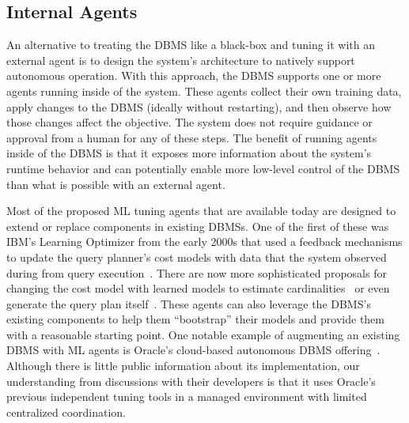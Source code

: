 \documentclass[11pt,times]{article}
\begin{document}
\subsection{Internal Agents}
\label{sec:ml-internal}
An alternative to treating the DBMS like a black-box and tuning it with an 
external agent is to design the system's architecture to natively
support autonomous operation. With this approach, the DBMS supports one or more 
agents running inside of the system. These agents collect their own training data, apply changes to 
the 
DBMS (ideally without restarting), and then observe how those changes affect the objective. The 
system does not require guidance or approval from a human for any of these steps.
The benefit of running agents inside of the DBMS is that it exposes more 
information about the system's runtime behavior and can potentially enable more low-level control 
of the DBMS than what is possible with an external agent.

Most of the proposed ML tuning agents that are available today are designed to extend or replace 
components in existing DBMSs. One of the first of these was IBM's 
Learning Optimizer from the early 2000s that used a feedback mechanisms to update 
the query planner's cost models with data that the system observed during from query 
execution~\cite{stillger01}. There are now more sophisticated proposals for changing the 
cost model with learned models to estimate cardinalities~\cite{ivanov17,liu15,woltmann19,kipf19} or 
even generate the query plan itself~\cite{ortiz18,marcus19}. These agents can also leverage the 
DBMS's existing components to help them ``bootstrap'' their models and provide them with a 
reasonable starting point.
% 
One notable example of augmenting an existing DBMS with ML agents is Oracle's cloud-based 
autonomous DBMS offering~\cite{oracle-selfdriving}. Although there is little public 
information about its implementation, our understanding from discussions with their developers is 
that it uses Oracle's previous independent tuning tools in a managed environment with limited 
centralized coordination.
\end{document}
